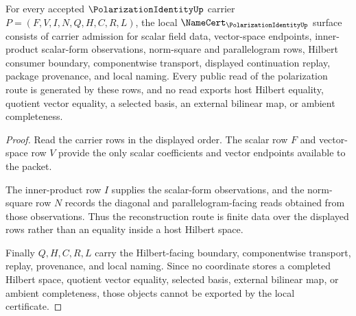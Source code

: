 \begin{theorem}
\label{thm:polarization-identity-namecert-obligations}
For every accepted $\PolarizationIdentityUp$ carrier $P=(F,V,I,N,Q,H,C,R,L)$, the local $\NameCert_{\PolarizationIdentityUp}$ surface consists of carrier admission for scalar field data, vector-space endpoints, inner-product scalar-form observations, norm-square and parallelogram rows, Hilbert consumer boundary, componentwise transport, displayed continuation replay, package provenance, and local naming. Every public read of the polarization route is generated by these rows, and no read exports host Hilbert equality, quotient vector equality, a selected basis, an external bilinear map, or ambient completeness.
\end{theorem}
\begin{proof}
Read the carrier rows in the displayed order. The scalar row $F$ and vector-space row $V$ provide the only scalar coefficients and vector endpoints available to the packet.

The inner-product row $I$ supplies the scalar-form observations, and the norm-square row $N$ records the diagonal and parallelogram-facing reads obtained from those observations. Thus the reconstruction route is finite data over the displayed rows rather than an equality inside a host Hilbert space.

Finally $Q,H,C,R,L$ carry the Hilbert-facing boundary, componentwise transport, replay, provenance, and local naming. Since no coordinate stores a completed Hilbert space, quotient vector equality, selected basis, external bilinear map, or ambient completeness, those objects cannot be exported by the local certificate.
\end{proof}

